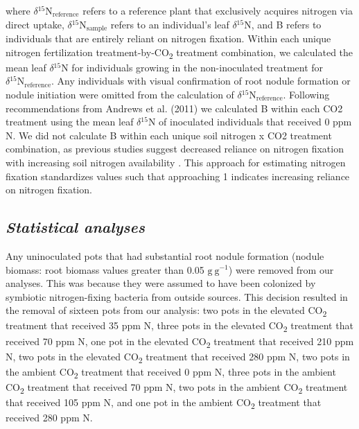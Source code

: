 \noindent where $\delta\mathrm{^{15}{N}_{reference}}$ refers to a reference plant that exclusively acquires nitrogen via direct uptake, $\delta\mathrm{^{15}{N}_{sample}}$ refers to an individual’s leaf $\delta\mathrm{^{15}{N}}$, and B refers to individuals that are entirely reliant on nitrogen fixation. Within each unique nitrogen fertilization treatment-by-CO\textsubscript{2} treatment combination, we calculated the mean leaf $\delta\mathrm{^{15}{N}}$ for individuals growing in the non-inoculated treatment for $\delta\mathrm{^{15}{N}_{reference}}$. Any individuals with visual confirmation of root nodule formation or nodule initiation were omitted from the calculation of $\delta\mathrm{^{15}{N}_{reference}}$. Following recommendations from Andrews et al. (2011) we calculated B within each CO2 treatment using the mean leaf $\delta\mathrm{^{15}{N}}$ of inoculated individuals that received 0 ppm N. We did not calculate B within each unique soil nitrogen x CO2 treatment combination, as previous studies suggest decreased reliance on nitrogen fixation with increasing soil nitrogen availability . This approach for estimating nitrogen fixation standardizes values such that approaching 1 indicates increasing reliance on nitrogen fixation.

\subsection{\textit{Statistical analyses}}
Any uninoculated pots that had substantial root nodule formation (nodule biomass: root biomass values greater than 0.05 $\mathrm{g\ g^{-1}}$) were removed from our analyses. This was because they were assumed to have been colonized by symbiotic nitrogen-fixing bacteria from outside sources. This decision resulted in the removal of sixteen pots from our analysis: two pots in the elevated CO\textsubscript{2} treatment that received 35 ppm N, three pots in the elevated CO\textsubscript{2} treatment that received 70 ppm N, one pot in the elevated CO\textsubscript{2} treatment that received 210 ppm N, two pots in the elevated CO\textsubscript{2} treatment that received 280 ppm N, two pots in the ambient CO\textsubscript{2} treatment that received 0 ppm N, three pots in the ambient CO\textsubscript{2} treatment that received 70 ppm N, two pots in the ambient CO\textsubscript{2} treatment that received 105 ppm N, and one pot in the ambient CO\textsubscript{2} treatment that received 280 ppm N.

